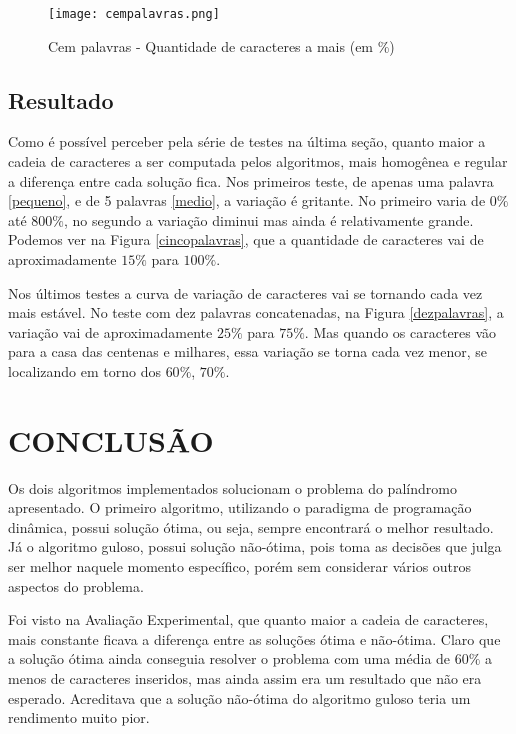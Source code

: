 \documentclass[12pt]{article}
\begin{document}
    \begin{figure}[h!]
        \centering
        \texttt{[image: cempalavras.png]}
        \caption{Cem palavras - Quantidade de caracteres a mais (em \%)}
        \label{cempalavras}
    \end{figure}

\subsection{Resultado}

	Como é possível perceber pela série de testes na última seção, quanto maior a cadeia de caracteres a ser computada pelos algoritmos, mais homogênea e regular a diferença entre cada solução fica. Nos primeiros teste, de apenas uma palavra \ref{pequeno}, e de 5 palavras \ref{medio}, a variação é gritante. No primeiro varia de $0\%$ até $800\%$, no segundo a variação diminui mas ainda é relativamente grande. Podemos ver na Figura \ref{cincopalavras}, que a quantidade de caracteres vai de aproximadamente $15\%$ para $100\%$.

	Nos últimos testes a curva de variação de caracteres vai se tornando cada vez mais estável. No teste com dez palavras concatenadas, na Figura \ref{dezpalavras}, a variação vai de aproximadamente $25\%$ para $75\%$. Mas quando os caracteres vão para a casa das centenas e milhares, essa variação se torna cada vez menor, se localizando em torno dos $60\%$, $70\%$.


\section{CONCLUSÃO}
\label{conclusao}

    Os dois algoritmos implementados solucionam o problema do palíndromo apresentado. O primeiro algoritmo, utilizando o paradigma de programação dinâmica, possui solução ótima, ou seja, sempre encontrará o melhor resultado. Já o algoritmo guloso, possui solução não-ótima, pois toma as decisões que julga ser melhor naquele momento específico, porém sem considerar vários outros aspectos do problema.

    Foi visto na Avaliação Experimental, que quanto maior a cadeia de caracteres, mais constante ficava a diferença entre as soluções ótima e não-ótima. Claro que a solução ótima ainda conseguia resolver o problema com uma média de $60\%$ a menos de caracteres inseridos, mas ainda assim era um resultado que não era esperado. Acreditava que a solução não-ótima do algoritmo guloso teria um rendimento muito pior.
\end{document}
